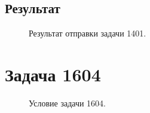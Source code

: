 \documentclass[a5paper, 10pt]{article}
\theoremstyle{definition}
\theoremstyle{plain}
\theoremstyle{remark}
\begin{document}
\subsection{Результат}
\begin{figure}[h]
\caption{Результат отправки задачи 1401.}
\end{figure}



\newpage

\section{Задача 1604}

\begin{figure}[h]
\caption{Условие задачи 1604.}
\end{figure}
\end{document}
